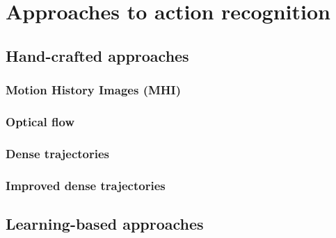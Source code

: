 \section{Approaches to action recognition}

\subsection{Hand-crafted approaches}

\subsubsection{Motion History Images (MHI)}

\subsubsection{Optical flow}

\subsubsection{Dense trajectories}

\subsubsection{Improved dense trajectories}

\subsection{Learning-based approaches}